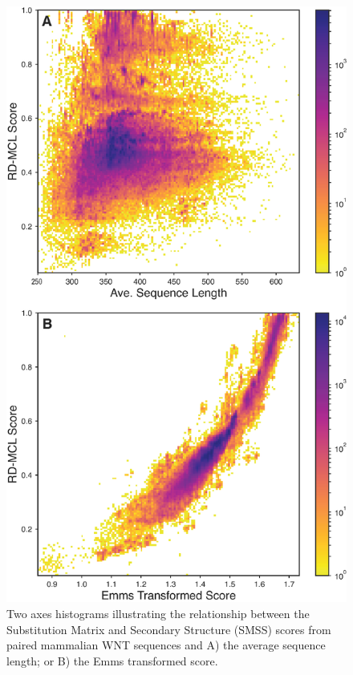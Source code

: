 \documentclass[twocolumn]{bmcart}  %
\begin{document}
\begin{figure}[t]
  \begin{center}
  \includegraphics[height=0.4\textheight]{../figures/rdmcl_scoring.eps}
\end{center}
\caption{Two axes histograms illustrating the relationship between the Substitution Matrix and Secondary Structure (SMSS) scores from paired mammalian WNT sequences and A) the average sequence length; or B) the Emms transformed score.}
\label{fig:rdmclscores}
\end{figure}
\end{document}

